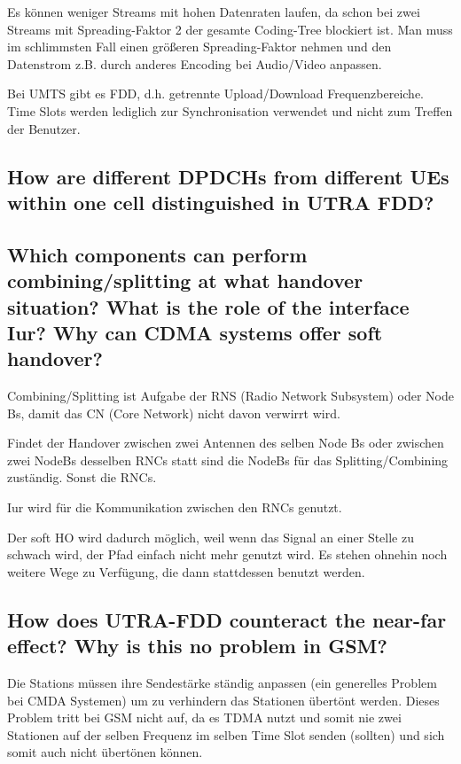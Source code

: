 Es können weniger Streams mit hohen Datenraten laufen, da schon bei zwei Streams mit Spreading-Faktor 2 der gesamte Coding-Tree blockiert ist. Man muss im schlimmsten Fall einen größeren Spreading-Faktor nehmen und den Datenstrom z.B. durch anderes Encoding bei Audio/Video anpassen.

Bei UMTS gibt es FDD, d.h. getrennte Upload/Download Frequenzbereiche. Time Slots werden lediglich zur Synchronisation verwendet und nicht zum Treffen der Benutzer.

\subsection{How are different DPDCHs from different UEs within one cell distinguished in UTRA FDD?}

\subsection{Which components can perform combining/splitting at what handover situation? What is the role of the interface Iur? Why can CDMA systems offer soft handover?}
Combining/Splitting ist Aufgabe der RNS (Radio Network Subsystem) oder Node Bs, damit das CN (Core Network) nicht davon verwirrt wird.

Findet der Handover zwischen zwei Antennen des selben Node Bs oder zwischen zwei NodeBs desselben RNCs statt sind die NodeBs für das Splitting/Combining zuständig. Sonst die RNCs.

Iur wird für die Kommunikation zwischen den RNCs genutzt.

Der soft HO wird dadurch möglich, weil wenn das Signal an einer Stelle zu schwach wird, der Pfad einfach nicht mehr genutzt wird. Es stehen ohnehin noch weitere Wege zu Verfügung, die dann stattdessen benutzt werden.
\subsection{How does UTRA-FDD counteract the near-far effect? Why is this no problem in GSM?}
Die Stations müssen ihre Sendestärke ständig anpassen (ein generelles Problem bei CMDA Systemen) um zu verhindern das Stationen übertönt werden. Dieses Problem tritt bei GSM nicht auf, da es TDMA nutzt und somit nie zwei Stationen auf der selben Frequenz im selben Time Slot senden (sollten) und sich somit auch nicht übertönen können.


